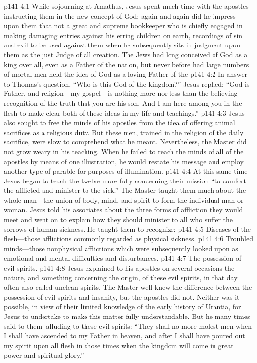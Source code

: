 \vs p141 4:1 While sojourning at Amathus, Jesus spent much time with the apostles instructing them in the new concept of God; again and again did he impress upon them that  not a great and supreme bookkeeper who is chiefly engaged in making damaging entries against his erring children on earth, recordings of sin and evil to be used against them when he subsequently sits in judgment upon them as the just Judge of all creation. The Jews had long conceived of God as a king over all, even as a Father of the nation, but never before had large numbers of mortal men held the idea of God as a loving Father of the 
\vs p141 4:2 In answer to Thomas’s question, “Who is this God of the kingdom?” Jesus replied: \textcolor{ubdarkred}{“God is  Father, and religion---my gospel---is nothing more nor less than the believing recognition of the truth that you are his son. And I am here among you in the flesh to make clear both of these ideas in my life and teachings.”}
\vs p141 4:3 Jesus also sought to free the minds of his apostles from the idea of offering animal sacrifices as a religious duty. But these men, trained in the religion of the daily sacrifice, were slow to comprehend what he meant. Nevertheless, the Master did not grow weary in his teaching. When he failed to reach the minds of all of the apostles by means of one illustration, he would restate his message and employ another type of parable for purposes of illumination.
\pc \vs p141 4:4 At this same time Jesus began to teach the twelve more fully concerning their mission \textcolor{ubdarkred}{“to comfort the afflicted and minister to the sick.”} The Master taught them much about the whole man---the union of body, mind, and spirit to form the individual man or woman. Jesus told his associates about the three forms of affliction they would meet and went on to explain how they should minister to all who suffer the sorrows of human sickness. He taught them to recognize:
\pc \vs p141 4:5 \bibnobreakspace Diseases of the flesh---those afflictions commonly regarded as physical sickness.
\vs p141 4:6 \bibnobreakspace Troubled minds---those nonphysical afflictions which were subsequently looked upon as emotional and mental difficulties and disturbances.
\vs p141 4:7 \bibnobreakspace The possession of evil spirits.
\pc \vs p141 4:8 Jesus explained to his apostles on several occasions the nature, and something concerning the origin, of these evil spirits, in that day often also called unclean spirits. The Master well knew the difference between the possession of evil spirits and insanity, but the apostles did not. Neither was it possible, in view of their limited knowledge of the early history of Urantia, for Jesus to undertake to make this matter fully understandable. But he many times said to them, alluding to these evil spirits: \textcolor{ubdarkred}{“They shall no more molest men when I shall have ascended to my Father in heaven, and after I shall have poured out my spirit upon all flesh in those times when the kingdom will come in great power and spiritual glory.”}\plusone
